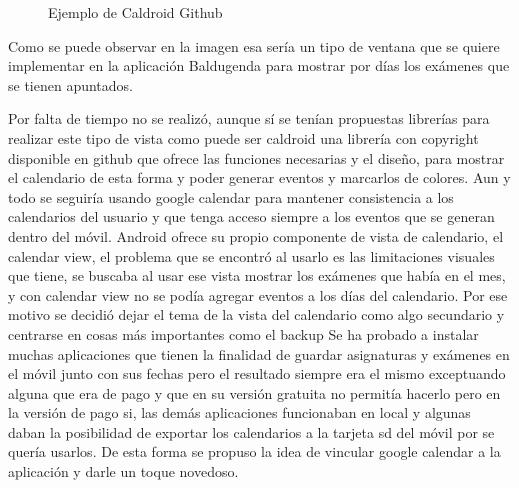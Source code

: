 \begin{figure}[H] 
  \begin{center} 
    \caption{Ejemplo de Caldroid Github} 
    \label{fig:Caldroid} 
  \end{center} 
\end{figure}

Como se puede observar en la imagen esa sería un tipo de ventana que se quiere implementar en la aplicación Baldugenda para mostrar por días los exámenes que se tienen apuntados.

 
Por falta de tiempo no se realizó, aunque sí se tenían propuestas librerías para realizar este tipo de vista como puede ser caldroid una librería con copyright disponible en github que ofrece las funciones necesarias y el diseño, para mostrar el calendario de esta forma y poder generar eventos y marcarlos de colores.
Aun y todo se seguiría usando google calendar para mantener consistencia a los calendarios del usuario y que tenga acceso siempre a los eventos que se generan dentro del móvil.
Android ofrece su propio componente de vista de calendario, el calendar view, el problema que se encontró al usarlo es las limitaciones visuales que tiene, se buscaba al usar ese vista mostrar los exámenes que había en el mes, y con calendar view no se podía agregar eventos a los días del calendario.
Por ese motivo se decidió dejar el tema de la vista del calendario como algo secundario y centrarse en cosas más importantes como el backup
Se ha probado a instalar muchas aplicaciones que tienen la finalidad de guardar asignaturas y exámenes en el móvil junto con sus fechas pero el resultado siempre era el mismo exceptuando alguna que era de pago y que en su versión gratuita no permitía hacerlo pero en la versión de pago si, las demás aplicaciones funcionaban en local y algunas daban la posibilidad de exportar los calendarios a la tarjeta sd del móvil por se quería usarlos.
De esta forma se propuso la idea de vincular google calendar a la aplicación y darle un toque novedoso.

